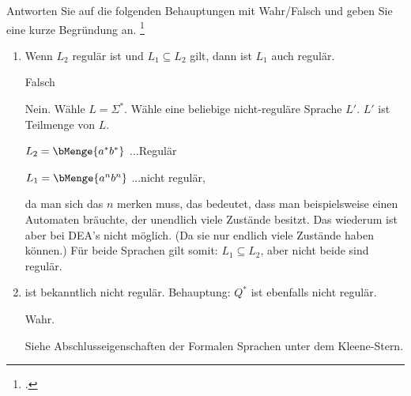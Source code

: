 \documentclass{bschlangaul-aufgabe}
\begin{document}

\let\m=\bMenge

Antworten Sie auf die folgenden Behauptungen mit Wahr/Falsch und geben
Sie eine kurze Begründung an.
\footcite{examen:66115:2019:03}

\begin{enumerate}


\item Wenn $L_2$ regulär ist und $L_1 \subseteq L_2$ gilt, dann ist
$L_1$ auch regulär.

\begin{bAntwort}
Falsch

Nein. Wähle $L = \Sigma^*$. Wähle eine beliebige nicht-reguläre Sprache
$L'$. $L'$ ist Teilmenge von $L$.

%

$L_2 = \m{a^* b^*}$ ...Regulär

$L_1 = \m{a^n
b^n}$ ...nicht regulär,

da man sich das $n$ merken muss, das bedeutet,
dass man beispielsweise einen Automaten bräuchte, der unendlich viele
Zustände besitzt. Das wiederum ist aber bei DEA’s nicht möglich. (Da sie
nur endlich viele Zustände haben können.) Für beide Sprachen gilt somit:
$L_1 \subseteq L_2$, aber nicht beide sind regulär.
\end{bAntwort}


\item {} ist
bekanntlich nicht regulär. Behauptung: $Q^*$ ist ebenfalls nicht
regulär.

\begin{bAntwort}
Wahr.

Siehe Abschlusseigenschaften der Formalen Sprachen unter dem Kleene-Stern.
\end{bAntwort}


\end{enumerate}
\end{document}
